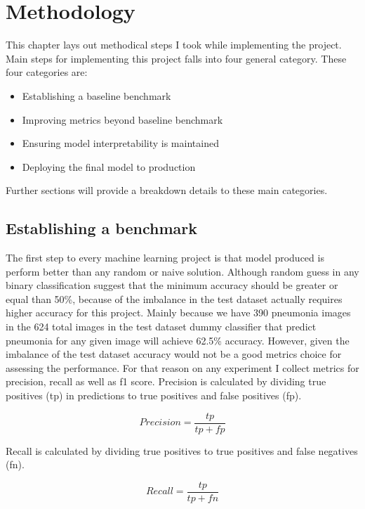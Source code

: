 \chapter{Methodology} \label{chap:methodology}
This chapter lays out methodical steps I took while implementing the project.
Main steps for implementing this project falls into four general category.
These four categories are:
\begin{itemize}
    \item Establishing a baseline benchmark
    \item Improving metrics beyond baseline benchmark
    \item Ensuring model interpretability is maintained
    \item Deploying the final model to production
\end{itemize}

Further sections will provide a breakdown details to these main categories.

\section{Establishing a benchmark}
The first step to every machine learning project is that model produced is perform better than any random or naive solution.
Although random guess in any binary classification suggest that the minimum accuracy should be greater or equal than 50\%, because of the imbalance in the test dataset actually requires higher accuracy for this project.
Mainly because we have 390 pneumonia images in the 624 total images in the test dataset dummy classifier that predict pneumonia for any given image will achieve 62.5\% accuracy.
However, given the imbalance of the test dataset accuracy would not be a good metrics choice for assessing the performance.
For that reason on any experiment I collect metrics for precision, recall as well as f1 score.
Precision is calculated by dividing true positives (tp) in predictions to true positives and false positives (fp).

\begin{equation}
    Precision = \frac{tp}{tp + fp}
\end{equation}

Recall is calculated by dividing true positives to true positives and false negatives (fn).

\begin{equation}
    Recall = \frac{tp}{tp + fn}
\end{equation}

